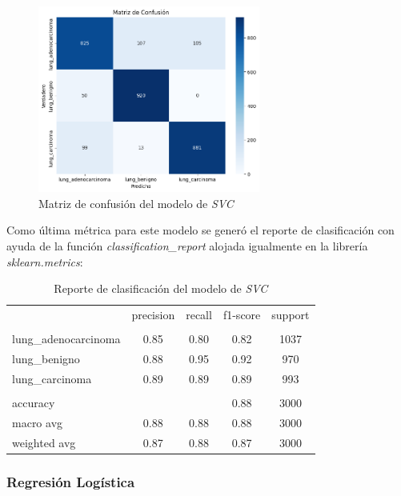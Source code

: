 \begin{figure}[H]
    \centering
    \includegraphics[width=0.65\textwidth]{Francisco/Imagenes resultados/CMSVM.png} 
    \caption{Matriz de confusión del modelo de \textit{SVC}}
\end{figure}

Como última métrica para este modelo se generó el reporte de clasificación con ayuda de la función \textit{classification\_report} alojada igualmente en la librería \textit{sklearn.metrics}:

\begin{table}[H]
    \centering
    \begin{tabular}{l c c c c}

         & precision & recall & f1-score & support \\
        \\
        lung\_adenocarcinoma & 0.85 & 0.80 & 0.82 & 1037 \\
        lung\_benigno & 0.88 & 0.95 & 0.92 & 970 \\
        lung\_carcinoma & 0.89 & 0.89 & 0.89 & 993 \\
        \\
        accuracy &  &  & 0.88 & 3000 \\
        macro avg & 0.88 & 0.88 & 0.88 & 3000 \\
        weighted avg & 0.87 & 0.88 & 0.87 & 3000
        
    \end{tabular}
    \caption{Reporte de clasificación del modelo de \textit{SVC}}
\end{table}

\subsubsection{Regresión Logística}

